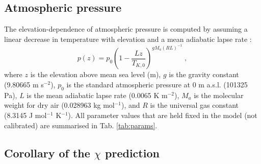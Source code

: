 \documentclass{myreport}
\begin{document}
\subsection{Atmospheric pressure}
\label{sec:press}
The elevation-dependence of atmospheric pressure is computed by assuming a linear decrease in temperature with elevation and a mean adiabatic lapse rate \citep{berberan97}:
\begin{equation}
\label{eq:pz}
    p(z) = p_0 \left( 
      1 - \frac{L z}{T_{K,0}} 
    \right)^{g M_a (R L)^{-1}} \;,
\end{equation} 
where $z$ is the elevation above mean sea level (m), $g$ is the gravity constant (9.80665 m s$^{-2}$), $p_0$ is the standard atmospheric pressure at 0 m a.s.l. (101325 Pa), $L$ is the mean adiabatic lapse rate (0.0065 K m$^{-2}$), $M_a$ is the molecular weight for dry air (0.028963 kg mol$^{-1}$), and $R$ is the universal gas constant (8.3145 J mol$^{-1}$ K$^{-1}$). All parameter values that are held fixed in the model (not calibrated) are summarised in Tab. \ref{tab:params}.

\subsection{Corollary of the $\chi$ prediction}
\label{sec:corollary}
\end{document}
